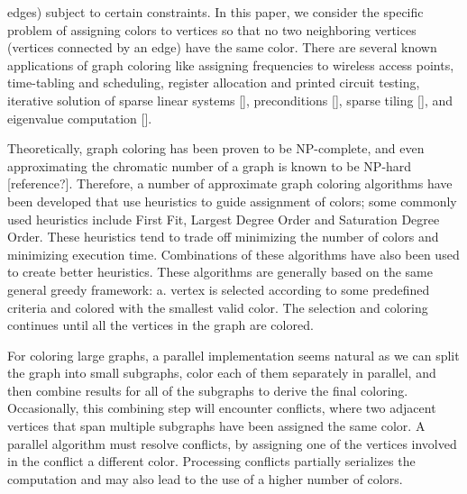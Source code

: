 \documentclass[preprint]{sigplanconf}
\begin{document}
edges) subject to certain constraints. In this paper, we consider the specific problem of assigning colors to vertices so that no two neighboring vertices (vertices connected by an edge) have the same color.  There are several known applications of graph coloring like assigning frequencies to wireless access points, time-tabling and scheduling, register allocation and printed circuit testing, iterative solution of sparse linear systems [], preconditions [], sparse tiling [], and eigenvalue computation [].  

Theoretically,  graph coloring has been proven to be NP-complete, and even approximating the chromatic number of a graph is known to be NP-hard [reference?]. Therefore, a number of approximate graph coloring algorithms have been developed that use heuristics to guide assignment of colors; some commonly used heuristics include First Fit, Largest Degree Order and Saturation Degree Order.  These heuristics tend to trade off minimizing the number of colors and minimizing execution time.  Combinations of these algorithms have also been used to create better heuristics. These algorithms are generally based on the same general greedy framework: a. vertex is selected according to some predefined criteria and colored with the smallest valid color. The selection and coloring continues until all the vertices in the graph are colored.

For coloring large graphs, a parallel implementation seems natural as we can split the graph into small subgraphs, color each of them separately in parallel, and then combine results for all of the subgraphs to derive the final coloring.   Occasionally, this combining step will encounter conflicts, where two adjacent vertices that span multiple subgraphs have been assigned the same color.  A parallel algorithm must resolve conflicts, by assigning one of the vertices involved in the conflict a different color.    Processing conflicts partially serializes the computation and may also lead to the use of a higher number of colors.
\end{document}

